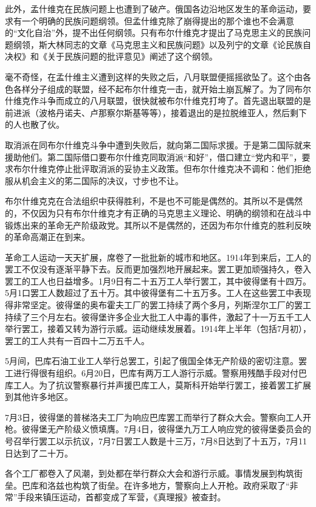 此外，孟什维克在民族问题上也遭到了破产。俄国各边沿地区发生的革命运动，要求有一个明确的民族问题纲领。但孟什维克除了崩得提出的那个谁也不会满意的“文化自治”外，提不出任何纲领。只有布尔什维克才提出了马克思主义的民族问题纲领，斯大林同志的文章《马克思主义和民族问题》以及列宁的文章《论民族自决权》和《关于民族问题的批评意见》阐述了这个纲领。

毫不奇怪，在孟什维主义遭到这样的失败之后，八月联盟便摇摇欲坠了。这个由各色各样分子组成的联盟，经不起布尔什维克一击，就开始土崩瓦解了。为了同布尔什维克作斗争而成立的八月联盟，很快就被布尔什维克打垮了。首先退出联盟的是前进派（波格丹诺夫、卢那察尔斯基等等），接着退出的是拉脱维亚人，然后剩下的人也散了伙。

取消派在同布尔什维克斗争中遭到失败后，就向第二国际求援。于是第二国际就来援助他们。第二国际借口要布尔什维克同取消派“和好”，借口建立“党内和平”，要求布尔什维克停止批评取消派的妥协主义政策。但布尔什维克决不调和：他们拒绝服从机会主义的笫二国际的决议，寸步也不让。

布尔什维克克在合法组织中获得胜利，不是也不可能是偶然的。其所以不是偶然的，不仅因为只有布尔什维克才有正确的马克思主义理论、明确的纲领和在战斗中锻炼出来的革命无产阶级政党。其所以不是偶然的，还因为布尔什维克的胜利反映的革命高潮正在到来。

革命工人运动一天天扩展，席卷了一批批新的城市和地区。1914年到来后，工人的罢工不仅没有逐渐平静下去。反而更加强烈地开展起来。罢工更加顽强持久，卷入罢工的工人也日益增多。1月9日有二十五万工人举行罢工，其中彼得堡有十四万。5月1口罢工人数超过了五十万。其中彼得堡有二十五万多。工人在这些罢工中表现得非常坚定。彼得堡的奥布霍夫工厂的罢工持续了两个多月，列斯涅尔工厂的罢工持续了三个月左右。彼得堡许多企业大批工人中毒的事件，激起了十一万五千工人举行罢工，接着又转为游行示威。运动继续发展着。1914年上半年（包括7月初），罢工的工人共有一百四十二万五千人。

5月间，巴库石油工业工人举行总罢工，引起了俄国全体无产阶级的密切注意。罢工进行得很有组织。6月20日，巴库有两万工人游行示威。警察用残酷手段对付巴库工人。为了抗议警察暴行并声援巴库工人，莫斯科开始举行罢工，接着罢工扩展到其他许多地区。

7月3日，彼得堡的普梯洛夫工厂为响应巴库罢工而举行了群众大会。警察向工人开枪。彼得堡无产阶级义愤填膺。7月4日，彼得堡九万工人响应党的彼得堡委员会的号召举行罢工以示抗议，7月7日罢工人数是十三万，7月8日达到了十五万，7月11日达到了二十万。

各个工厂都卷入了风潮，到处都在举行群众大会和游行示威。事情发展到构筑街垒。巴库和洛兹也构筑了街垒。在许多地方，警察向上人开枪。政府采取了“非常”手段来镇压运动，首都变成了军营，《真理报》被查封。

